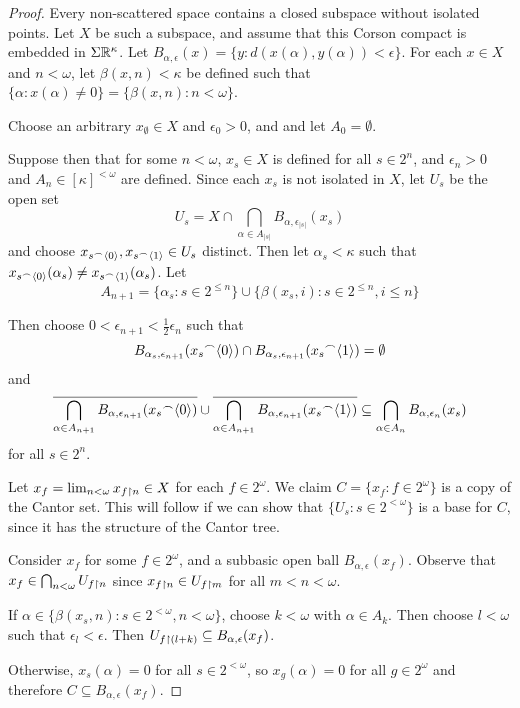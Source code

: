 \documentclass[11pt]{article}
\begin{document}
  \begin{proof}
    Every non-scattered space contains a closed subspace without
    isolated points. Let $X$ be such a subspace, and assume that this
    Corson compact is embedded in $\Sigma\mathbb{R}^{\kappa}$. Let
    $B_{\alpha,\epsilon}(x)=\{y: d(x(\alpha),y(\alpha))<\epsilon\}$.
    For each $x\in X$ and $n<\omega$, let $\beta(x,n)<\kappa$ be defined
    such that
    $\{\alpha:x(\alpha)\not=0\}=\{\beta(x,n):n<\omega\}$.

    Choose an arbitrary $x_\emptyset\in X$ and $\epsilon_0>0$, and
    and let $A_0=\emptyset$.

    Suppose then that for some $n<\omega$,
    $x_s\in X$ is defined for all $s\in 2^n$,
    and $\epsilon_n>0$ and $A_n\in[\kappa]^{<\omega}$ are defined.
    Since each $x_s$ is not isolated in $X$, let $U_s$ be the open
    set
      \[
        U_s
          =
        X
          \cap
        \bigcap_{\alpha\in A_{|s|}} B_{\alpha,\epsilon_{|s|}}(x_s)
      \]
    and choose $x_{s{^\frown}\langle0\rangle},x_{s{^\frown}\langle1\rangle}\in U_s$ distinct.
    Then let $\alpha_s<\kappa$ such that
    $x_{s{^\frown}\langle0\rangle}(\alpha_s)\not=x_{s{^\frown}\langle1\rangle}(\alpha_s)$.
    Let
      \[
        A_{n+1}
          =
        \{\alpha_s:s\in2^{\leq n}\}
          \cup
        \{\beta(x_s,i):s\in2^{\leq n},i\leq n\}
      \]

    Then choose $0<\epsilon_{n+1}<\frac{1}{2}\epsilon_n$ such that
    \[
      B_{\alpha_s,\epsilon_{n+1}}(x_s{^\frown}\langle0\rangle)
        \cap
      B_{\alpha_s,\epsilon_{n+1}}(x_s{^\frown}\langle1\rangle)
        =
      \emptyset
    \]
    and
    \[
      \overline{
        \bigcap_{\alpha\in A_{n+1}}
        B_{\alpha,\epsilon_{n+1}}(x_s{^\frown}\langle0\rangle)
      }
        \cup
      \overline{
        \bigcap_{\alpha\in A_{n+1}}
        B_{\alpha,\epsilon_{n+1}}(x_s{^\frown}\langle1\rangle)
      }
        \subseteq
      \bigcap_{\alpha\in A_n} B_{\alpha,\epsilon_n}(x_s)
    \]
    for all $s\in 2^n$.

    Let $x_f=\lim_{n<\omega} x_{f\restriction n}\in X$
    for each $f\in 2^\omega$. We claim $C=\{x_f:f\in 2^\omega\}$
    is a copy of the Cantor set. This will follow if we can show that
    $\{U_s:s\in 2^{<\omega}\}$ is a base for $C$, since it has
    the structure of the Cantor tree.

    Consider $x_f$ for some $f\in 2^\omega$, and a subbasic open ball
    $B_{\alpha,\epsilon}(x_f)$. Observe that
    $x_f\in\bigcap_{n<\omega} U_{f\restriction n}$ since
    $x_{f\restriction n}\in U_{f\restriction m}$ for all $m<n<\omega$.

    If $\alpha\in\{\beta(x_s,n):s\in2^{<\omega},n<\omega\}$, choose
    $k<\omega$ with $\alpha\in A_k$. Then choose $l<\omega$ such that
    $\epsilon_l<\epsilon$. Then
    $U_{f\restriction(l+k)}\subseteq B_{\alpha,\epsilon}(x_f)$.

    Otherwise, $x_s(\alpha)=0$ for all $s\in2^{<\omega}$, so
    $x_g(\alpha)=0$ for all $g\in2^\omega$ and therefore
    $C\subseteq B_{\alpha,\epsilon}(x_f)$.
  \end{proof}
\end{document}
